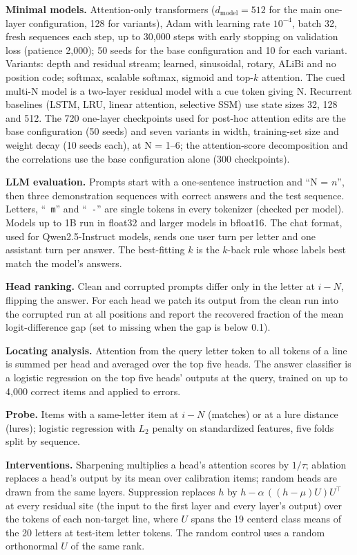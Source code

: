 \documentclass{article}
\begin{document}
\textbf{Minimal models.} Attention-only transformers ($d_{\text{model}}=512$ for the main one-layer configuration, 128 for variants), Adam with learning rate $10^{-4}$, batch 32, fresh sequences each step, up to 30,000 steps with early stopping on validation loss (patience 2,000); 50 seeds for the base configuration and 10 for each variant. Variants: depth and residual stream; learned, sinusoidal, rotary, ALiBi and no position code; softmax, scalable softmax, sigmoid and top-$k$ attention. The cued multi-N model is a two-layer residual model with a cue token giving N. Recurrent baselines (LSTM, LRU, linear attention, selective SSM) use state sizes 32, 128 and 512. The 720 one-layer checkpoints used for post-hoc attention edits are the base configuration (50 seeds) and seven variants in width, training-set size and weight decay (10 seeds each), at N = 1--6; the attention-score decomposition and the correlations use the base configuration alone (300 checkpoints).

\textbf{LLM evaluation.} Prompts start with a one-sentence instruction and ``N = $n$'', then three demonstration sequences with correct answers and the test sequence. Letters, ``\texttt{ m}'' and ``\texttt{ -}'' are single tokens in every tokenizer (checked per model). Models up to 1B run in float32 and larger models in bfloat16. The chat format, used for Qwen2.5-Instruct models, sends one user turn per letter and one assistant turn per answer. The best-fitting $k$ is the $k$-back rule whose labels best match the model's answers.

\textbf{Head ranking.} Clean and corrupted prompts differ only in the letter at $i-N$, flipping the answer. For each head we patch its output from the clean run into the corrupted run at all positions and report the recovered fraction of the mean logit-difference gap (set to missing when the gap is below 0.1).

\textbf{Locating analysis.} Attention from the query letter token to all tokens of a line is summed per head and averaged over the top five heads. The answer classifier is a logistic regression on the top five heads' outputs at the query, trained on up to 4,000 correct items and applied to errors.

\textbf{Probe.} Items with a same-letter item at $i-N$ (matches) or at a lure distance (lures); logistic regression with $L_2$ penalty on standardized features, five folds split by sequence.

\textbf{Interventions.} Sharpening multiplies a head's attention scores by $1/\tau$; ablation replaces a head's output by its mean over calibration items; random heads are drawn from the same layers. Suppression replaces $h$ by $h-\alpha\,((h-\mu)U)U^\top$ at every residual site (the input to the first layer and every layer's output) over the tokens of each non-target line, where $U$ spans the 19 centerd class means of the 20 letters at test-item letter tokens. The random control uses a random orthonormal $U$ of the same rank.
\end{document}

